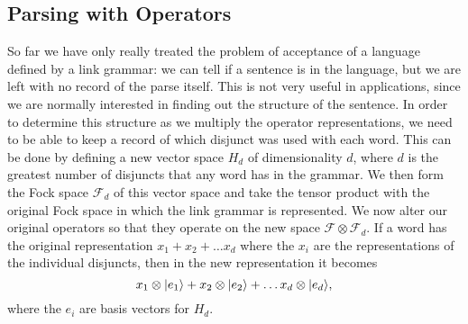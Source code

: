 



\subsection{Parsing with Operators}

So far we have only really treated the problem of acceptance of a language defined by a link grammar: we can tell if a sentence is in the language, but we are left with no record of the parse itself. This is not very useful in applications, since we are normally interested in finding out the structure of the sentence. In order to determine this structure as we multiply the operator representations, we need to be able to keep a record of which disjunct was used with each word. This can be done by defining a new vector space $H_d$ of dimensionality $d$, where $d$ is the greatest number of disjuncts that any word has in the grammar. We then form the Fock space $\mathcal{F}_d$ of this vector space and take the tensor product with the original Fock space in which the link grammar is represented. We now alter our original operators so that they operate on the new space $\mathcal{F} \otimes \mathcal{F}_d$. If a word has the original representation $x_1 + x_2 + \ldots x_d$ where the $x_i$ are the representations of the individual disjuncts, then in the new representation it becomes
$$x_1\otimes |e_1 \rangle + x_2 \otimes |e_2 \rangle + \ldots x_d\otimes |e_d \rangle,$$
where the $e_i$ are basis vectors for $H_d$.

